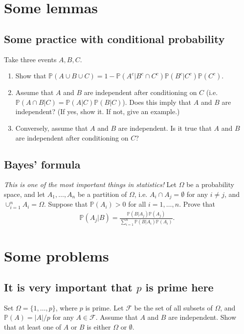\documentclass[12pt,reqno]{amsart}
\theoremstyle{definition}
\theoremstyle{remark}
\numberwithin{equation}{section}
\begin{document}
\section{Some lemmas}
\subsection{Some practice with conditional probability}
Take three events $A,B,C$. 
\begin{enumerate}
\item Show that $\mathbb{P}(A\cup B\cup C)=1-\mathbb{P}(A^{c}|B^{c}\cap C^{c})\mathbb{P}(B^{c}|C^{c})\mathbb{P}(C^{c})$.
\item Assume that $A$ and $B$ are independent after conditioning on $C$ (i.e. $\mathbb{P}(A\cap B|C)=\mathbb{P}(A|C)\mathbb{P}(B|C)$). Does this imply that $A$ and $B$ are independent? (If yes, show it. If not, give an example.)
\item Conversely, assume that $A$ and $B$ are independent. Is it true that $A$ and $B$ are independent after conditioning on $C$?
\end{enumerate}
\subsection{Bayes' formula}
\emph{This is one of the most important things in statistics!} Let $\Omega$ be a probability space, and let $A_{1},\ldots,A_{n}$ be a partition of $\Omega$, i.e. $A_{i}\cap A_{j}=\emptyset$ for any $i\neq j$, and $\cup_{i=1}^{n}A_{i}=\Omega$.  Suppose that $\mathbb{P}(A_{i})>0$ for all $i=1,\ldots,n$. Prove that 
%
\begin{align}
\mathbb{P}(A_{j}|B)=\frac{\mathbb{P}(B|A_{j})\mathbb{P}(A_{j})}{\sum_{i=1}^{n}\mathbb{P}(B|A_{i})\mathbb{P}(A_{i})}.\nonumber
\end{align}
%
%
%
%
\section{Some problems}
\subsection{It is very important that $p$ is prime here}
Set $\Omega=\{1,\ldots,p\}$, where $p$ is prime. Let $\mathscr{F}$ be the set of all subsets of $\Omega$, and $\mathbb{P}(A)=|A|/p$ for any $A\in\mathscr{F}$. Assume that $A$ and $B$ are independent. Show that at least one of $A$ or $B$ is either $\Omega$ or $\emptyset$.
\end{document}
